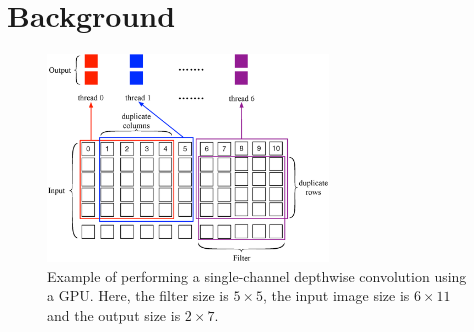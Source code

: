 
\section{Background}




\begin{figure}[t!]
\centering
  \includegraphics[width=0.9\columnwidth,height=5.5cm]{./figure/twostrategies.eps}
  \caption{Example of performing a single-channel depthwise convolution using a GPU. Here, the filter size is $5 \times 5$, the input image size is $6 \times 11$
  and the output size is $2 \times 7$.}
  \label{fig:twostrategies}
\end{figure}


